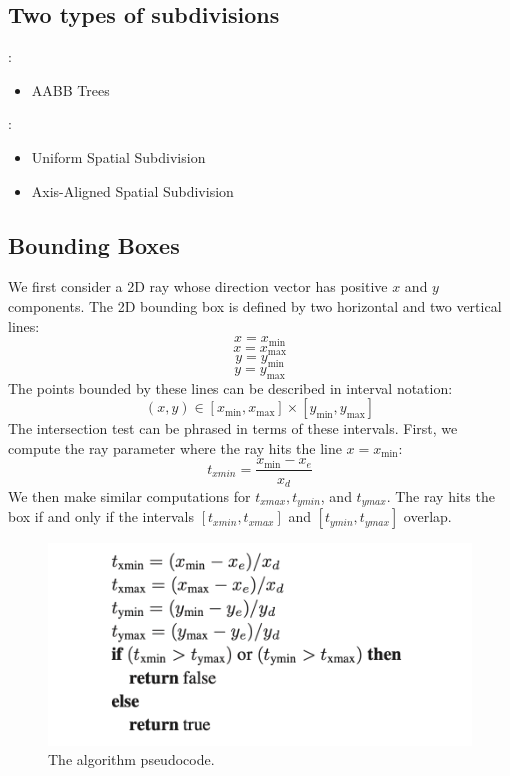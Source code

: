 \documentclass[11pt]{article}
\numberwithin{equation}{section}
\begin{document}
\subsection{Two types of subdivisions}
:
\begin{itemize}
	\item AABB Trees
\end{itemize}
:
\begin{itemize}
	\item Uniform Spatial Subdivision
	\item Axis-Aligned Spatial Subdivision
\end{itemize}


\subsection{Bounding Boxes}
	We first consider a 2D ray whose direction vector has positive $x$ and $y$ components. The 2D bounding box is defined by two horizontal and two vertical lines:
	$$x = x_{\min}$$
	$$x = x_{\max}$$
	$$y = y_{\min}$$
	$$y = y_{\max}$$
	The points bounded by these lines can be described in interval notation:
	$$(x,y) \in [x_{\min}, x_{\max}] \times [y_{\min}, y_{\max}]$$
	The intersection test can be phrased in terms of these intervals. First, we compute the ray parameter where the ray hits the line $x = x_{\min}$:
	$$t_{xmin} = \frac{x_{\min} - x_e}{x_d}$$
	We then make similar computations for $t_{xmax}, t_{ymin}$, and $t_{ymax}$. The ray hits the box if and only if the intervals $[t_{xmin}, t_{xmax}]$ and $[t_{ymin}, t_{ymax}]$ overlap.
	
	\begin{figure}[H]
	\centering
	\includegraphics[scale=0.7]{p6}
	\caption{The algorithm pseudocode.}
	\end{figure}
	
\end{document}
